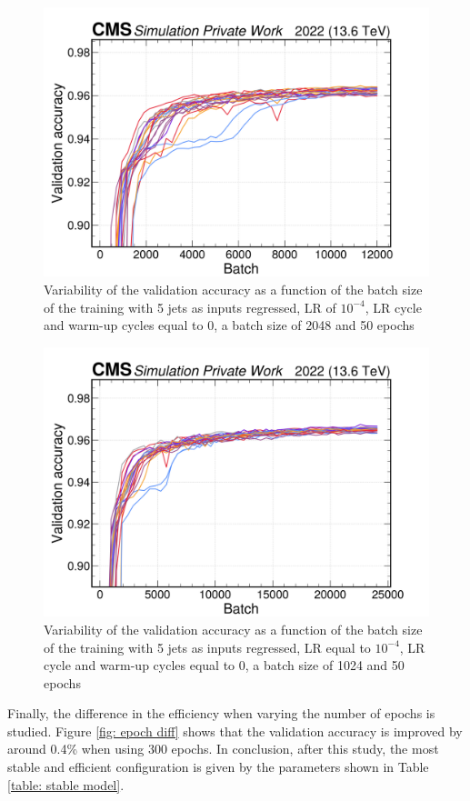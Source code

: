 \begin{figure}[hbt]
    \centering
    \includegraphics[width=0.7\linewidth]{Images/6.Improving/Variability Study/var 2048.png}
    \caption{Variability of the validation accuracy as a function of the batch size of the training with 5 jets as inputs \pt regressed, LR of $10^{-4}$, LR cycle and warm-up cycles equal to 0, a batch size of 2048 and 50 epochs}
    \label{fig: stable test}
\end{figure}

\begin{figure}[hbt]
    \centering
    \includegraphics[width=0.7\linewidth]{Images/6.Improving/Variability Study/var 1024.png}
    \caption{Variability of the validation accuracy as a function of the batch size of the training with 5 jets as inputs \pt regressed, LR equal to $10^{-4}$, LR cycle and warm-up cycles equal to 0, a batch size of 1024 and 50 epochs}
    \label{fig: stable test 1024}
\end{figure}



Finally, the difference in the efficiency when varying the number of epochs is studied. Figure \ref{fig: epoch diff} shows that the validation accuracy is improved by around 0.4\% when using 300 epochs. In conclusion, after this study, the most stable and efficient configuration is given by the parameters shown in Table \ref{table: stable model}.

